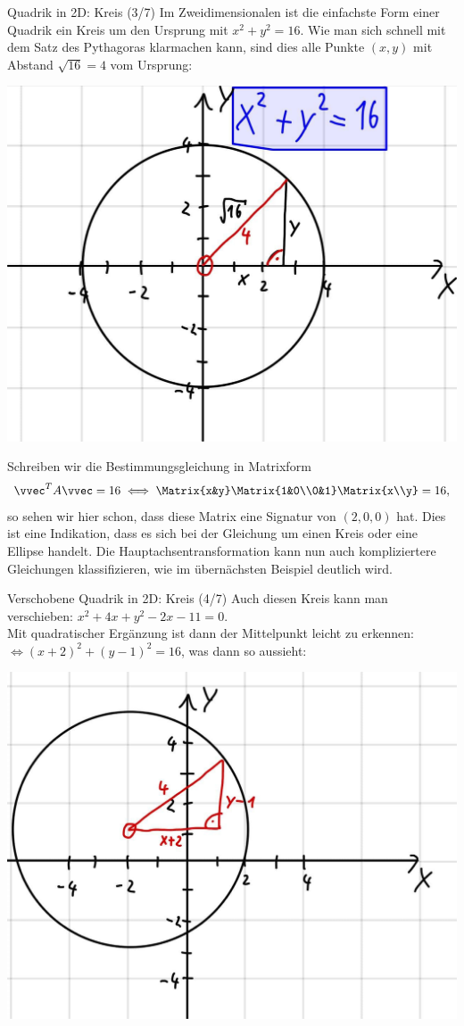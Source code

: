\begin{Beispiel}
{Quadrik in 2D: Kreis (3/7)}
Im Zweidimensionalen ist die einfachste Form einer Quadrik ein Kreis um den Ursprung mit $\boxed{x^2+y^2=16}$.
Wie man sich schnell mit dem Satz des Pythagoras klarmachen kann, sind dies alle Punkte $(x,y)$ mit Abstand $\sqrt{16}=4$ vom Ursprung:
\begin{center}
    \includegraphics[width=.3\textwidth]{Dateien/05/05Quadrik3.jpg}
\end{center}
Schreiben wir die Bestimmungsgleichung in Matrixform
\begin{equation}
    \vvec^T A \vvec=16\iff \Matrix{x&y}\Matrix{1&0\\0&1}\Matrix{x\\y}=16,
\end{equation}
so sehen wir hier schon, dass diese Matrix eine Signatur von $(2,0,0)$ hat. Dies ist eine Indikation, dass es sich bei der Gleichung um einen Kreis oder eine Ellipse handelt. Die Hauptachsentransformation kann nun auch kompliziertere Gleichungen klassifizieren, wie im übernächsten Beispiel deutlich wird.
\end{Beispiel}

\begin{Beispiel}
{Verschobene Quadrik in 2D: Kreis (4/7)}
Auch diesen Kreis kann man verschieben: $\boxed{x^2+4x+y^2-2x-11=0}$.\\
Mit quadratischer Ergänzung ist dann der Mittelpunkt leicht zu erkennen:\\
$\iff (x+2)^2+(y-1)^2=16$, was dann so aussieht:
\begin{center}
    \includegraphics[width=.3\textwidth]{Dateien/05/05Quadrik4.jpg}
\end{center}
\end{Beispiel}

